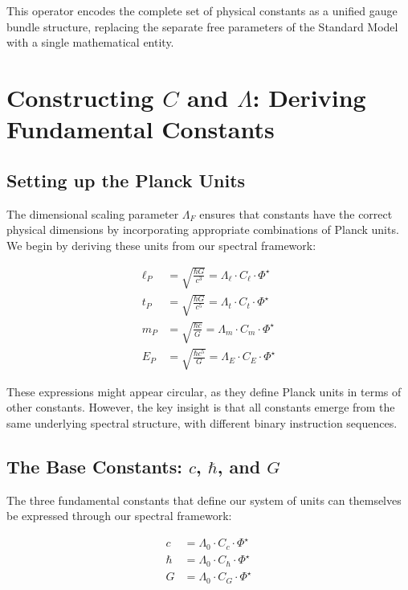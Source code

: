 \documentclass{article}
\begin{document}
This operator encodes the complete set of physical constants as a unified gauge bundle structure, replacing the separate free parameters of the Standard Model with a single mathematical entity.

\section{Constructing $C$ and $\Lambda$: Deriving Fundamental Constants}

\subsection{Setting up the Planck Units}

The dimensional scaling parameter $\Lambda_F$ ensures that constants have the correct physical dimensions by incorporating appropriate combinations of Planck units. We begin by deriving these units from our spectral framework:

\begin{align}
\ell_P &= \sqrt{\frac{\hbar G}{c^3}} = \Lambda_\ell \cdot C_\ell \cdot \Phi^\star\\
t_P &= \sqrt{\frac{\hbar G}{c^5}} = \Lambda_t \cdot C_t \cdot \Phi^\star\\
m_P &= \sqrt{\frac{\hbar c}{G}} = \Lambda_m \cdot C_m \cdot \Phi^\star\\
E_P &= \sqrt{\frac{\hbar c^5}{G}} = \Lambda_E \cdot C_E \cdot \Phi^\star
\end{align}

These expressions might appear circular, as they define Planck units in terms of other constants. However, the key insight is that all constants emerge from the same underlying spectral structure, with different binary instruction sequences.

\subsection{The Base Constants: $c$, $\hbar$, and $G$}

The three fundamental constants that define our system of units can themselves be expressed through our spectral framework:

\begin{align}
c &= \Lambda_0 \cdot C_c \cdot \Phi^\star\\
\hbar &= \Lambda_0 \cdot C_\hbar \cdot \Phi^\star\\
G &= \Lambda_0 \cdot C_G \cdot \Phi^\star
\end{align}
\end{document}
